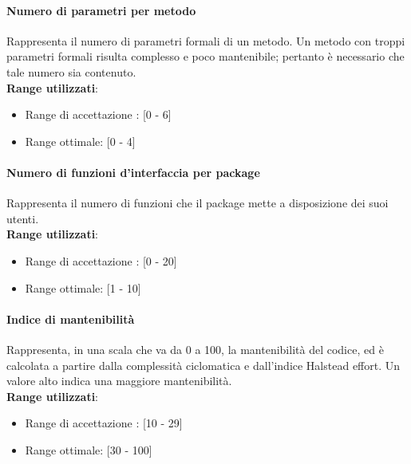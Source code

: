 \paragraph{Numero di parametri per metodo}
Rappresenta il numero di parametri formali di un metodo. Un metodo con troppi parametri formali risulta complesso e poco mantenibile; pertanto \`e necessario che tale numero sia contenuto. \\
\textbf{Range utilizzati}:
\begin{itemize}
	\item Range di accettazione : [0 - 6]
	\item Range ottimale: [0 - 4]
\end{itemize}

\paragraph{Numero di funzioni d'interfaccia per package}
Rappresenta il numero di funzioni che il package mette a disposizione dei suoi utenti. \\
\textbf{Range utilizzati}:
\begin{itemize}
	\item Range di accettazione : [0 - 20]
	\item Range ottimale: [1 - 10]
\end{itemize}

\paragraph{Indice di mantenibilit\`a}
Rappresenta, in una scala che va da 0 a 100, la mantenibilit\`a del codice, ed \`e calcolata a partire dalla complessit\`a ciclomatica e dall’indice Halstead effort. %
Un valore alto indica una maggiore mantenibilit\`a. \\
\textbf{Range utilizzati}:
\begin{itemize}
	\item Range di accettazione : [10 - 29]
	\item Range ottimale: [30 - 100]
\end{itemize}

